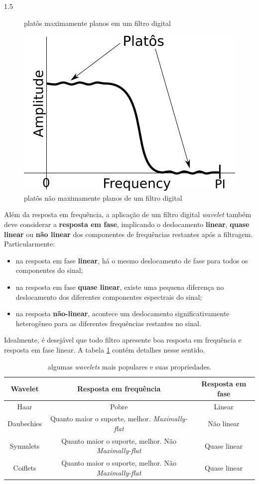 \documentclass[a4paper,12pt,openright,oneside]{book}
\newenvironment{myenv}[1]
{\begin{spacing}{#1}}
	{\end{spacing}}
\begin{document}
\begin{myenv}{1.5}
\begin{figure}[H]
\caption{platôs maximamente planos em um filtro digital}
\label{fig:daubechies}
\end{figure}
\begin{figure}[H]
\centering
\includegraphics[width=0.3\linewidth]{images/noMaximallyFlat}
\caption{platôs não maximamente planos de um filtro digital}
\label{fig:nomaximallyflat}
\end{figure}
\par Além da resposta em frequência, a aplicação de um filtro digital \textit{wavelet} também deve considerar a \textbf{resposta em fase}, implicando o deslocamento \textbf{linear}, \textbf{quase linear} ou \textbf{não linear} dos componentes de frequências restantes após a filtragem. Particularmente:
\begin{itemize}
\item na resposta em fase \textbf{linear}, há o mesmo deslocamento de fase para todos os componentes do sinal;
\item na resposta em fase \textbf{quase linear}, existe uma pequena diferença no deslocamento dos diferentes componentes espectrais do sinal;
\item na resposta \textbf{não-linear}, acontece um deslocamento significativamente heterogêneo para as diferentes frequências restantes no sinal.
\end{itemize}
\par Idealmente, é desejável que todo filtro apresente boa resposta em frequência e resposta em fase linear. A tabela \ref{tab:waveletsProperties} contém detalhes nesse sentido.
\begin{table}[H]
\centering
\begin{tabular}{|c|c|c|}
\hline 
\textbf{Wavelet} & \textbf{Resposta em frequência} & \textbf{Resposta em fase} \\ 
\hline 
Haar & Pobre &  Linear \\ 
\hline 
Daubechies & Quanto maior o suporte, melhor. \textit{Maximally-flat}  &  Não linear \\ 
\hline 
Symmlets & Quanto maior o suporte, melhor. Não \textit{Maximally-flat} & Quase linear \\ 
\hline 
Coiflets & Quanto maior o suporte, melhor. Não \textit{Maximally-flat} & Quase linear \\ 
\hline 
\end{tabular} 
\caption{algumas \textit{wavelets} mais populares e suas propriedades.}	\label{tab:waveletsProperties}
\end{table}

\end{myenv}
\end{document}
